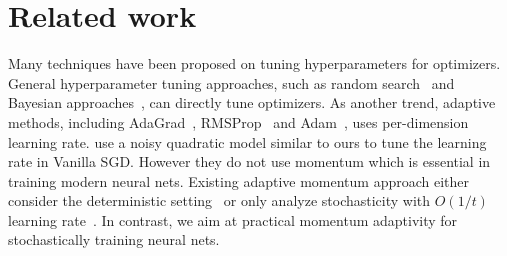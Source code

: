 \documentclass{article}
\begin{document}
\section{Related work}
\label{sec:related}
\vspace{-0.45em}
Many techniques have been proposed on tuning hyperparameters for optimizers. General hyperparameter tuning approaches, such as random search~\citep{bergstra2012random} and Bayesian approaches~\citep{snoek2012practical, hutter2011sequential}, can directly tune optimizers.  
As another trend, adaptive methods, including AdaGrad~\citep{duchi2011adaptive}, RMSProp~\citep{tieleman2012lecture} and Adam~\citep{kingma2014adam}, uses per-dimension learning rate. 
\citet{schaul2013no} use a noisy quadratic model similar to ours to tune the learning rate in Vanilla SGD.
However they do not use momentum which is essential in training modern neural nets. Existing adaptive momentum approach either consider the deterministic setting~\citep{graepel2002stable,rehman2011effect,hameed2016back,swanston1994simple,ampazis2000levenberg,qiu1992accelerated} or only analyze stochasticity with $O(1/t)$ learning rate~\citep{leen1994optimal}. In contrast, we aim at practical momentum adaptivity for stochastically training neural nets.  
\end{document}
